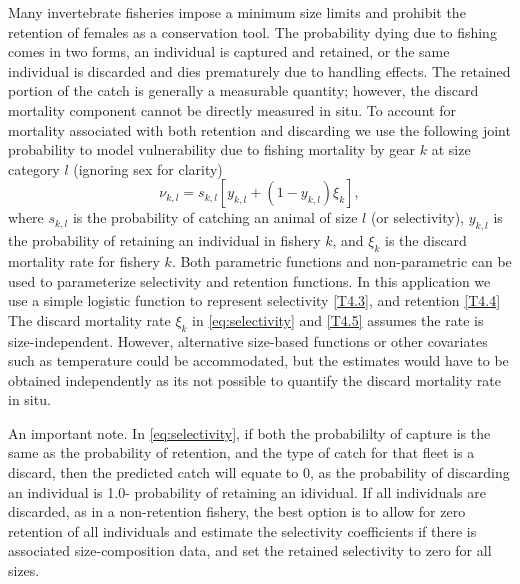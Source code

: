 \documentclass[12pt,letterpaper]{article}
\begin{document}
    Many invertebrate fisheries  impose a minimum size limits and prohibit the retention of females as a conservation tool.  The probability dying due to fishing comes in two forms, an individual is captured and retained, or the same individual is discarded and dies prematurely due to handling effects.  The retained portion of the catch is generally a measurable quantity; however, the discard mortality component cannot be directly measured in situ.  To account for mortality associated with both retention and discarding we use the following joint probability to model vulnerability due to fishing mortality by gear $k$ at size category $l$ (ignoring sex for clarity)
    \begin{equation}\label{eq:selectivity}
      \nu_{k,l}  = s_{k,l} [y_{k,l} + (1-y_{k,l})\xi_{k}],
    \end{equation}
    where $s_{k,l}$ is the probability of catching an animal of size $l$ (or selectivity), $y_{k,l}$ is the probability of retaining an individual in fishery $k$, and $\xi_{k}$ is the discard mortality rate for fishery $k$.  Both parametric functions and non-parametric can be used to parameterize selectivity and retention functions.  In this application we use a simple logistic function to represent selectivity \eqref{T4.3}, and retention \eqref{T4.4} The discard mortality rate $\xi_k$ in \eqref{eq:selectivity} and \eqref{T4.5} assumes the rate is size-independent.  However, alternative size-based functions or other covariates such as temperature could be accommodated, but the estimates would have to be obtained independently as its not possible to quantify the discard mortality rate in situ.

    An important note.  In \eqref{eq:selectivity}, if both the probabililty of capture is the same as the probability of retention, and the type of catch for that fleet is a discard, then the predicted catch will equate to 0, as the probability of discarding an individual is 1.0- probability of retaining an idividual.  If all individuals are discarded, as in a non-retention fishery, the best option is to allow for zero retention of all individuals and estimate the selectivity coefficients if there is associated size-composition data, and set the retained selectivity to zero for all sizes.
\end{document}
